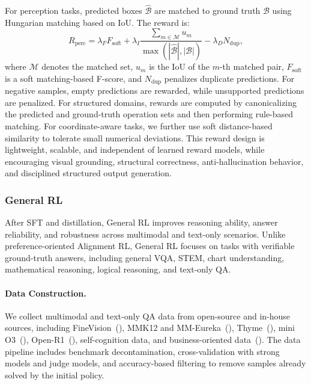 \documentclass{article} %
\begin{document}
For perception tasks, predicted boxes $\hat{\mathcal{B}}$ are matched to ground truth $\mathcal{B}$ using Hungarian matching based on IoU. The reward is:
\begin{equation}
R_{\mathrm{perc}} =
\lambda_F F_{\mathrm{soft}} +
\lambda_I
\frac{\sum_{m \in \mathcal{M}} u_m}
{\max(|\hat{\mathcal{B}}|,|\mathcal{B}|)}
-
\lambda_D N_{\mathrm{dup}},
\end{equation}
where $\mathcal{M}$ denotes the matched set, $u_m$ is the IoU of the $m$-th matched pair, $F_{\mathrm{soft}}$ is a soft matching-based F-score, and $N_{\mathrm{dup}}$ penalizes duplicate predictions. For negative samples, empty predictions are rewarded, while unsupported predictions are penalized. For structured domains, rewards are computed by canonicalizing the predicted and ground-truth operation sets and then performing rule-based matching. For coordinate-aware tasks, we further use soft distance-based similarity to tolerate small numerical deviations. This reward design is lightweight, scalable, and independent of learned reward models, while encouraging visual grounding, structural correctness, anti-hallucination behavior, and disciplined structured output generation.

\subsubsection{General RL}

After SFT and distillation, General RL improves reasoning ability, answer reliability, and robustness across multimodal and text-only scenarios. Unlike preference-oriented Alignment RL, General RL focuses on tasks with verifiable ground-truth answers, including general VQA, STEM, chart understanding, mathematical reasoning, logical reasoning, and text-only QA.

\paragraph{Data Construction.}
We collect multimodal and text-only QA data from open-source and in-house sources, including FineVision~(\cite{finevision}), MMK12 and MM-Eureka~(\cite{mm_eureka}), Thyme~(\cite{thyme}), mini O3~(\cite{minio3}), Open-R1~(\cite{openr1}), self-cognition data, and business-oriented data~(\cite{kuaimod}). The data pipeline includes benchmark decontamination, cross-validation with strong models and judge models, and accuracy-based filtering to remove samples already solved by the initial policy.
\end{document}
